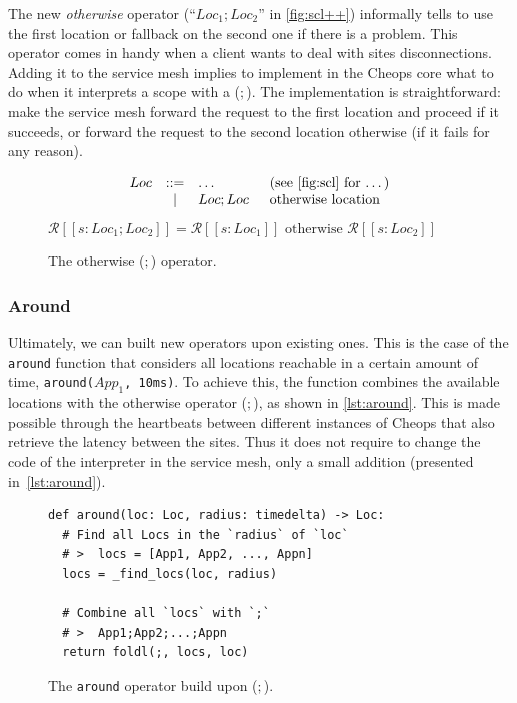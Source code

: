 The new \emph{otherwise} operator (``$Loc_1;Loc_2$'' in
\autoref{fig:scl++}) informally tells to use the first location or
fallback on the second one if there is a problem.
%
This operator comes in handy when a client wants to deal with sites
disconnections.
%
Adding it to the service mesh implies to implement in the Cheops core
what to do when it interprets a scope with a ($;$).
%
The implementation is straightforward: make the service mesh forward
the request to the first location and proceed if it succeeds, or
forward the request to the second location otherwise (if it fails for
any reason).
\begin{figure}[htbp]
  \centering
    \small
    \[\begin{array}{l c l l}
    Loc      &::=  &\dots      &\enspace(\text{see \autoref{fig:scl} for \dots})\\
    &\mid &Loc ; Loc  &\enspace\text{otherwise location}
    \end{array}\]
    $\mathcal{R}[\![ s : Loc_1 ; Loc_2 ]\!]  =
    \mathcal{R}[\![ s : Loc_1 ]\!]  \text{ otherwise }
     \mathcal{R}[\![ s : Loc_2 ]\!]$
    \caption{The otherwise ($;$) operator.  }
    \label{fig:scl++}
  \end{figure}

\subsubsection{Around}
Ultimately, we can built new operators upon existing ones.
%
This is the case of the \texttt{around} function that considers all
locations reachable in a certain amount of time, \eg
\texttt{around($App_1$, 10ms)}.
%
To achieve this, the function combines the available locations with
the otherwise operator ($;$), as shown in \autoref{lst:around}.
%
This is made possible through the heartbeats between different
instances of Cheops that also retrieve the latency between the sites.
%
Thus it does not require to change the code of the interpreter in the
service mesh, only a small addition (presented
in~\autoref{lst:around}).

  \begin{figure}[htbp]
    \centering
    \vspace{10pt}
    \begin{lstlisting}
def around(loc: Loc, radius: timedelta) -> Loc:
  # Find all Locs in the `radius` of `loc`
  # >  locs = [App1, App2, ..., Appn]
  locs = _find_locs(loc, radius)

  # Combine all `locs` with `;`
  # >  App1;App2;...;Appn
  return foldl(;, locs, loc)
    \end{lstlisting}
    \caption{The \texttt{around} operator build upon ($;$).}
    \label{lst:around}
\end{figure}


